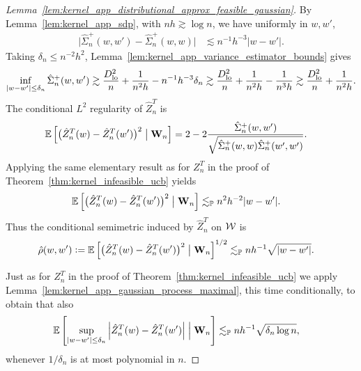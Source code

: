 \begin{proof}[%
  Lemma~\ref{lem:kernel_app_distributional_approx_feasible_gaussian}]
  By Lemma~\ref{lem:kernel_app_sdp},
  with $n h \gtrsim \log n$,
  we have
  uniformly in $w,w'$,
  \begin{align*}
    \big|
    \hat \Sigma_n^+(w,w')
    - \hat \Sigma_n^+(w,w)
    \big|
    &\lesssim
    n^{-1} h^{-3} |w-w'|.
  \end{align*}
  Taking
  $\delta_n \leq n^{-2} h^2$,
  Lemma~\ref{lem:kernel_app_variance_estimator_bounds}
  gives
  \begin{align*}
    \inf_{|w-w'| \leq \delta_n}
    \hat \Sigma_n^+(w,w')
    \gtrsim
    \frac{D_{\textup{lo}}^2}{n}
    + \frac{1}{n^2h}
    - n^{-1} h^{-3} \delta_n
    \gtrsim
    \frac{D_{\textup{lo}}^2}{n}
    + \frac{1}{n^2h}
    - \frac{1}{n^3h}
    \gtrsim
    \frac{D_{\textup{lo}}^2}{n}
    + \frac{1}{n^2h}.
  \end{align*}
  The conditional $L^2$
  regularity of $\hat Z_n^T$ is
  \begin{align*}
    \mathbb{E}\left[
      \big(
        \hat Z_n^T(w) - \hat Z_n^T(w')
      \big)^2
      \bigm\vert \mathbf{W}_n
    \right]
    &=
    2 - 2
    \frac{\hat \Sigma_n^+(w,w')}
    {\sqrt{\hat \Sigma_n^+(w,w) \hat \Sigma_n^+(w',w')}}.
  \end{align*}
  Applying the same elementary result as for $Z_n^T$
  in the proof of Theorem~\ref{thm:kernel_infeasible_ucb} yields
  \begin{align*}
    \mathbb{E}\left[
      \big(
        \hat Z_n^T(w) - \hat Z_n^T(w')
      \big)^2
      \bigm\vert \mathbf{W}_n
    \right]
    &\lesssim_{\mathbb{P}}
    n^2 h^{-2} |w-w'|.
  \end{align*}
  Thus the conditional semimetric
  induced by $\hat Z_n^T$ on $\mathcal{W}$ is
  \begin{align*}
    \hat\rho(w,w')
    &\vcentcolon=
    \mathbb{E}\left[
      \big(
        \hat Z_n^T(w) - \hat Z_n^T(w')
      \big)^2
      \bigm\vert \mathbf{W}_n
    \right]^{1/2}
    \lesssim_{\mathbb{P}}
    n h^{-1} \sqrt{|w-w'|}.
  \end{align*}


  Just as for $Z_n^T$
  in the proof of Theorem~\ref{thm:kernel_infeasible_ucb}
  we apply Lemma~\ref{lem:kernel_app_gaussian_process_maximal},
  this time conditionally,
  to obtain that also
  \begin{align*}
    \mathbb{E}\left[
      \sup_{|w-w'| \leq \delta_n}
      \left| \hat Z_n^T(w) - \hat Z_n^T(w') \right|
      \Bigm\vert \mathbf{W}_n
    \right]
    &\lesssim_{\mathbb{P}}
    n h^{-1}
    \sqrt{\delta_n \log n},
  \end{align*}
  whenever $1/\delta_n$
  is at most polynomial in $n$.


\end{proof}
